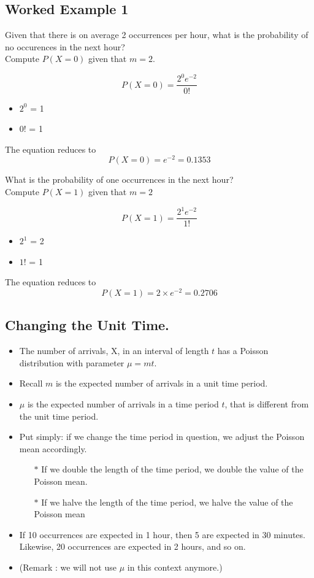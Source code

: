\documentclass[a4paper,12pt]{article}
\begin{document}
{
\subsection*{Worked Example 1}

	Given that there is on average 2 occurrences per hour, what is the probability of no occurences in the next hour? \\ Compute $P(X=0)$ given that $m=2$.
	
	\[ P(X = 0)=\frac{2^0 e^{-2}}{0!} \]
	\normalsize
	\begin{itemize}
		\item $2^0$ = 1
		\item $0!$ = 1
	\end{itemize}
	The equation reduces to
	\[ P(X = 0)=e^{-2} = 0.1353\]

\noindent What is the probability of one occurrences in the next hour? \\ Compute $P(X=1)$ given that $m=2$
	
	\[ P(X = 1)=\frac{2^1 e^{-2}}{1!} \]
	\normalsize
	\begin{itemize}
		\item $2^1$ = 2
		\item $1!$ = 1
	\end{itemize}
	The equation reduces to
	\[ P(X = 1) = 2 \times e^{-2} = 0.2706\]
}



\subsection*{Changing the Unit Time.}

\begin{itemize}
	\item The number of arrivals, X, in an interval of length $t$ has a
	Poisson distribution with parameter $\mu = mt$.
	\item Recall $m$ is the expected number of arrivals in a unit time period.
	\item $\mu$ is the expected number of arrivals in a time period $t$, that is different from the unit time period.
	\item Put simply: if we change the time period in question, we adjust the Poisson mean accordingly.
	\begin{itemize}
		\item[$\ast$] If we double the length of the time period, we double the value of the Poisson mean.
		\item[$\ast$] If we halve the length of the time period, we halve the value of the Poisson mean
	\end{itemize}
	\item If 10 occurrences are expected in 1 hour, then 5 are expected in 30 minutes. Likewise, 20 occurrences are expected in 2 hours, and so on.
	\item (Remark : we will not use $\mu$ in this context anymore.)
\end{itemize}
\end{document}
